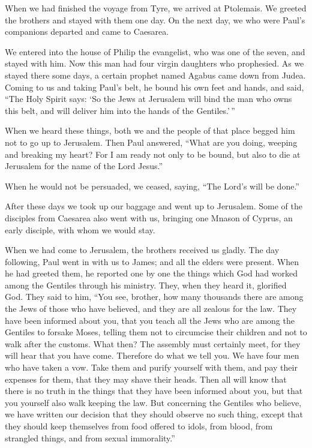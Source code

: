  When we had finished the voyage from Tyre, we arrived at
Ptolemais. We greeted the brothers and stayed with them one day.
 On the next day, we who were Paul's companions departed and
came to Caesarea.

We entered into the house of Philip the evangelist, who was one of the
seven, and stayed with him.  Now this man had four virgin
daughters who prophesied.  As we stayed there some days, a
certain prophet named Agabus came down from Judea.  Coming
to us and taking Paul's belt, he bound his own feet and hands, and said,
``The Holy Spirit says: `So the Jews at Jerusalem will bind the man who
owns this belt, and will deliver him into the hands of the
Gentiles.'\,''

 When we heard these things, both we and the people of that
place begged him not to go up to Jerusalem.  Then Paul
answered, ``What are you doing, weeping and breaking my heart? For I am
ready not only to be bound, but also to die at Jerusalem for the name of
the Lord Jesus.''

 When he would not be persuaded, we ceased, saying, ``The
Lord's will be done.''

 After these days we took up our baggage and went up to
Jerusalem.  Some of the disciples from Caesarea also went
with us, bringing one Mnason of Cyprus, an early disciple, with whom we
would stay.

 When we had come to Jerusalem, the brothers received us
gladly.  The day following, Paul went in with us to James;
and all the elders were present.  When he had greeted them,
he reported one by one the things which God had worked among the
Gentiles through his ministry.  They, when they heard it,
glorified God. They said to him, ``You see, brother, how many thousands
there are among the Jews of those who have believed, and they are all
zealous for the law.  They have been informed about you,
that you teach all the Jews who are among the Gentiles to forsake Moses,
telling them not to circumcise their children and not to walk after the
customs.  What then? The assembly must certainly meet, for
they will hear that you have come.  Therefore do what we
tell you. We have four men who have taken a vow.  Take them
and purify yourself with them, and pay their expenses for them, that
they may shave their heads. Then all will know that there is no truth in
the things that they have been informed about you, but that you yourself
also walk keeping the law.  But concerning the Gentiles who
believe, we have written our decision that they should observe no such
thing, except that they should keep themselves from food offered to
idols, from blood, from strangled things, and from sexual immorality.''


